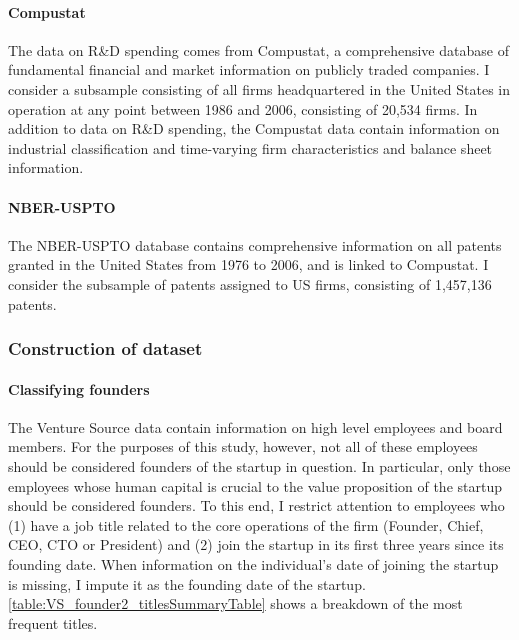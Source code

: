 \documentclass[11pt,english]{article}
\begin{document}
\paragraph{Compustat}

The data on R\&D spending comes from Compustat, a comprehensive database of fundamental financial and market information on publicly traded companies. I consider a subsample consisting of all firms headquartered in the United States in operation at any point between 1986 and 2006, consisting of 20,534 firms. In addition to data on R\&D spending, the Compustat data contain information on industrial classification and time-varying firm characteristics and balance sheet information.

\paragraph{NBER-USPTO}

The NBER-USPTO database contains comprehensive information on all patents granted in the United States from 1976 to 2006, and is linked to Compustat. I consider the subsample of patents assigned to US firms, consisting of 1,457,136 patents. 

\subsubsection{Construction of dataset}

\paragraph{Classifying founders}

The Venture Source data contain information on high level employees and board members. For the purposes of this study, however, not all of these employees should be considered founders of the startup in question. In particular, only those employees whose human capital is crucial to the value proposition of the startup should be considered founders. To this end, I restrict attention to employees who (1) have a job title related to the core operations of the firm (Founder, Chief, CEO, CTO or President) and (2) join the startup in its first three years since its founding date. When information on the individual's date of joining the startup is missing, I impute it as the founding date of the startup. \autoref{table:VS_founder2_titlesSummaryTable} shows a breakdown of the most frequent titles. 


\end{document}
